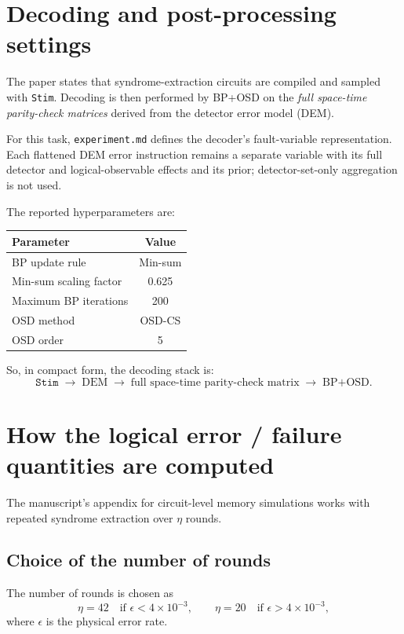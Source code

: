 \documentclass[11pt]{article}
\begin{document}
\section{Decoding and post-processing settings}
The paper states that syndrome-extraction circuits are compiled and sampled with \texttt{Stim}. Decoding is then performed by BP+OSD on the \emph{full space-time parity-check matrices} derived from the detector error model (DEM).

For this task, \texttt{experiment.md} defines the decoder's fault-variable
representation. Each flattened DEM error instruction remains a separate
variable with its full detector and logical-observable effects and its prior;
detector-set-only aggregation is not used.

The reported hyperparameters are:

\begin{center}
\begin{tabular}{lc}
\toprule
Parameter & Value \\
\midrule
BP update rule & Min-sum \\
Min-sum scaling factor & 0.625 \\
Maximum BP iterations & 200 \\
OSD method & OSD-CS \\
OSD order & 5 \\
\bottomrule
\end{tabular}
\end{center}

So, in compact form, the decoding stack is:
\[
\texttt{Stim} \;\longrightarrow\; \text{DEM} \;\longrightarrow\; \text{full space-time parity-check matrix} \;\longrightarrow\; \text{BP+OSD}.
\]

\section{How the logical error / failure quantities are computed}
The manuscript's appendix for circuit-level memory simulations works with repeated syndrome extraction over $\eta$ rounds.

\subsection{Choice of the number of rounds}
The number of rounds is chosen as
\[
\eta = 42 \quad \text{if } \epsilon < 4\times 10^{-3},
\qquad
\eta = 20 \quad \text{if } \epsilon > 4\times 10^{-3},
\]
where $\epsilon$ is the physical error rate.
\end{document}
